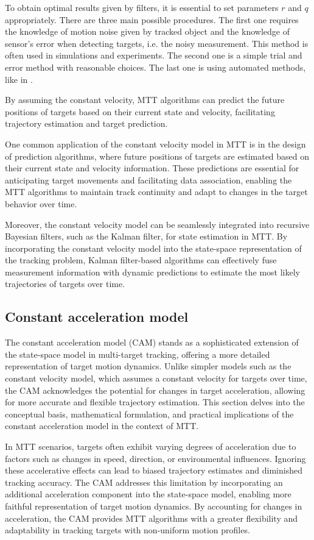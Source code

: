 To obtain optimal results given by filters, it is essential to set parameters $r$ and $q$ appropriately. There are
three main possible procedures. The first one requires the knowledge of motion noise given by tracked object and the
knowledge of sensor's error when detecting targets, i.e. the noisy measurement. This method is often used in
simulations and experiments. The second one is a simple trial
and error method with reasonable choices. The last one is using automated methods, like in \cite{BulutEastimation2011}.

By assuming the constant velocity, MTT
algorithms
can predict the future positions of targets based on their current state and velocity, facilitating trajectory estimation and target prediction.

One common application of the constant velocity model in MTT is in the design of prediction algorithms, where future positions of targets are estimated based on their current state and velocity information. These predictions are essential for anticipating target movements and facilitating data association, enabling the MTT algorithms to maintain track continuity and adapt to changes in the target behavior over time.

Moreover, the constant velocity model can be seamlessly integrated into recursive Bayesian filters, such as the Kalman filter, for state estimation in MTT. By incorporating the constant velocity model into the state-space representation of the tracking problem, Kalman filter-based algorithms can effectively fuse measurement information with dynamic predictions to estimate the most likely trajectories of targets over time.
    \subsection{Constant acceleration model}
The constant acceleration model (CAM) stands as a sophisticated extension of the state-space model in multi-target
tracking, offering a more detailed representation of target motion dynamics. Unlike simpler models such as the
constant velocity model, which assumes a constant velocity for targets over time, the CAM acknowledges the potential
for changes in target acceleration, allowing for more accurate and flexible trajectory estimation. This section
delves into the conceptual basis, mathematical formulation, and practical implications of the constant acceleration
model in the context of MTT.

In MTT scenarios, targets often exhibit varying degrees of acceleration due to factors such as changes in speed,
direction, or environmental influences. Ignoring these accelerative effects can lead to biased trajectory estimates and diminished tracking accuracy. The CAM addresses this limitation by incorporating an additional acceleration component into the state-space model, enabling more faithful representation of target motion dynamics. By accounting for changes in acceleration, the CAM provides MTT algorithms with a greater flexibility and adaptability in tracking targets with non-uniform motion profiles.

